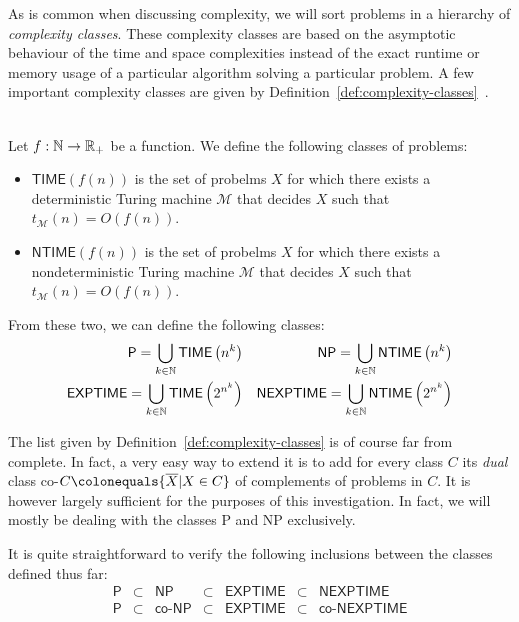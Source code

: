 As is common when discussing complexity, we will sort problems in a hierarchy of \emph{complexity classes}. These complexity classes are based on the asymptotic behaviour of the time and space complexities instead of the exact runtime or memory usage of a particular algorithm solving a particular problem. A few important complexity classes are given by Definition~\ref{def:complexity-classes}~\cite{langages-formels}.

\begin{definition}\ \\
    \label{def:complexity-classes}
    Let \(f: \mathbb{N} \rightarrow \mathbb{R}_+\) be a function. We define the following classes of problems:
    \begin{itemize}
        \item \(\textsf{TIME}(f(n))\) is the set of probelms \(X\) for which there exists a deterministic Turing machine \(\mathcal{M}\) that decides \(X\) such that \(t_{\mathcal{M}}(n) = O(f(n))\).
        \item 
        \(\textsf{NTIME}(f(n))\) is the set of probelms \(X\) for which there exists a nondeterministic Turing machine \(\mathcal{M}\) that decides \(X\) such that \(t_{\mathcal{M}}(n) = O(f(n))\).    
    \end{itemize}
    From these two, we can define the following classes:
    \begin{align*}
        \textsf{P} = \bigcup\limits_{k\in\mathbb{N}} \textsf{TIME}\left(n^k\right)& &
        \textsf{NP} = \bigcup\limits_{k\in\mathbb{N}} \textsf{NTIME}\left(n^k\right) \\
        \textsf{EXPTIME} = \bigcup\limits_{k\in\mathbb{N}} \textsf{TIME}\left(2^{n^k}\right) & &
        \textsf{NEXPTIME} = \bigcup\limits_{k\in\mathbb{N}} \textsf{NTIME}\left(2^{n^k}\right) \\
    \end{align*}
\end{definition}

The list given by Definition~\ref{def:complexity-classes} is of course far from complete. In fact, a very easy way to extend it is to add for every class \(C\) its \emph{dual} class co-\({C} \colonequals \{\overline{X}| X\in C\}\) of complements of problems in \(C\).
It is however largely sufficient for the purposes of this investigation. In fact, we will mostly be dealing with the classes \textsf{P} and \textsf{NP} exclusively.

It is quite straightforward to verify the following inclusions between the classes defined thus far:
\[
    \begin{array}{ccccccc}        
        \textsf{P} &\subset& \textsf{NP} &\subset& \textsf{EXPTIME} &\subset& \textsf{NEXPTIME} \\
        \textsf{P} &\subset& \textsf{co-NP} &\subset& \textsf{EXPTIME} &\subset& \textsf{co-NEXPTIME}
    \end{array}
\]

